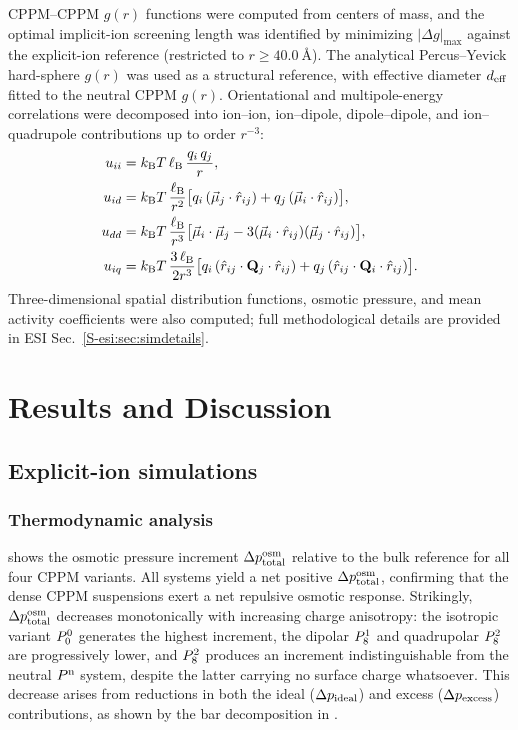 \documentclass{article}
\begin{document}
CPPM--CPPM $g(r)$ functions were computed from centers of mass, and the optimal implicit-ion screening length was identified by minimizing $|\Delta g|_\text{max}$ against the explicit-ion reference (restricted to $r \geq \qty{40.0}{\angstrom}$).
The analytical Percus--Yevick hard-sphere $g(r)$ was used as a structural reference, with effective diameter $d_{\mathrm{eff}}$ fitted to the neutral CPPM $g(r)$.
Orientational and multipole-energy correlations were decomposed into ion--ion, ion--dipole, dipole--dipole, and ion--quadrupole contributions up to order $r^{-3}$:
\begin{align}
    u_{ii} &= k_{\rm B}T\,\ell_{\rm B}\,\frac{q_i\,q_j}{r},
    \label{eq:u_ii}\\
    u_{id} &= k_{\rm B}T\,\frac{\ell_{\rm B}}{r^2}
               \bigl[q_i\,(\vec{\mu}_j\cdot\hat{r}_{ij})
                    +q_j\,(\vec{\mu}_i\cdot\hat{r}_{ij})\bigr],
    \label{eq:u_id}\\
    u_{dd} &= k_{\rm B}T\,\frac{\ell_{\rm B}}{r^3}
               \bigl[\vec{\mu}_i\cdot\vec{\mu}_j
                    -3(\vec{\mu}_i\cdot\hat{r}_{ij})
                      (\vec{\mu}_j\cdot\hat{r}_{ij})\bigr],
    \label{eq:u_dd}\\
    u_{iq} &= k_{\rm B}T\,\frac{3\,\ell_{\rm B}}{2r^3}
            \bigl[q_i\,(\hat{r}_{ij}\cdot\mathbf{Q}_j\cdot\hat{r}_{ij})
            +q_j\,(\hat{r}_{ij}\cdot\mathbf{Q}_i\cdot\hat{r}_{ij})\bigr].
    \label{eq:u_iq}
\end{align}
Three-dimensional spatial distribution functions, osmotic pressure, and mean activity coefficients were also computed; full methodological details are provided in ESI Sec.~\ref{S-esi:sec:simdetails}.

\section{Results and Discussion}

\subsection{Explicit-ion simulations}

\subsubsection{Thermodynamic analysis \label{sec:ther_ana}}

 shows the osmotic pressure increment $\Delta p^\mathrm{osm}_\mathrm{total}$ relative to the bulk  reference for all four CPPM variants.
All systems yield a net positive $\Delta p^\mathrm{osm}_\mathrm{total}$, confirming that the dense CPPM suspensions exert a net repulsive osmotic response.
Strikingly, $\Delta p^\mathrm{osm}_\mathrm{total}$ decreases monotonically with increasing charge anisotropy: the isotropic variant $P^{0}_{0}$ generates the highest increment, the dipolar $P^{1}_{8}$ and quadrupolar $P^{2}_{8}$ are progressively lower, and $P^{2}_{8}$ produces an increment indistinguishable from the neutral $P^\mathrm{n}$ system, despite the latter carrying no surface charge whatsoever.
This decrease arises from reductions in both the ideal ($\Delta p_\mathrm{ideal}$) and excess ($\Delta p_\mathrm{excess}$) contributions, as shown by the bar decomposition in .
\end{document}
